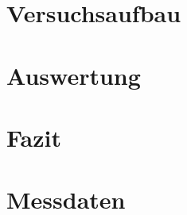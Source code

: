 \documentclass[
    oneside, 
    footinclude=off, 
    captions=tableheading, 
    DIV=12;usenames,
    dvipsnames
]{scrartcl}
\begin{document}
\newpage
\section{Versuchsaufbau} %
    

\newpage
\section{Auswertung}
    

\newpage
\section{Fazit}
    


\newpage
    
\newpage
    \listoffigures
    \listoftables


\newpage
    \section*{Messdaten}
    
\newpage
    
    
    



%
\end{document}
